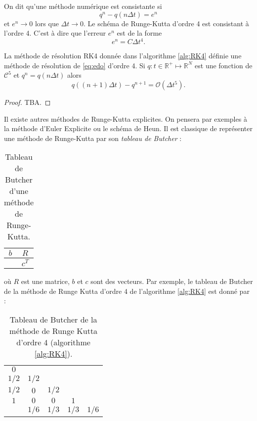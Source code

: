 On dit qu'une méthode numérique est consistante si
\begin{equation}
q^n - q(n \Delta t) = e^n
\end{equation}
et $e^n \rightarrow 0$ lors que $\Delta t \rightarrow 0$. Le schéma de Runge-Kutta d'ordre 4 est consistant à l'ordre 4. C'est à dire que l'erreur $e^n$ est de la forme
\begin{equation}
e^n = C \Delta t^4.
\end{equation}

\begin{theoreme}
La méthode de résolution RK4 donnée dans l'algorithme \ref{alg:RK4} définie une méthode de résolution de \ref{eq:edo} d'ordre 4. Si $q : t \in \mathbb{R}^+ \mapsto \mathbb{R}^N$ est une fonction de $\mathcal{C}^5$ et $q^n = q(n \Delta t)$ alors
\begin{equation}
q((n+1) \Delta t) - q^{n+1} = \mathcal{O} \left( \Delta t^5 \right).
\end{equation}
\end{theoreme}

\begin{proof}
TBA.
\end{proof}

Il existe autres méthodes de Runge-Kutta explicites. On pensera par exemples à la méthode d'Euler Explicite ou le schéma de Heun. Il est classique de représenter une méthode de Runge-Kutta par son \textit{tableau de Butcher} :

\begin{table}[htbp]
\begin{center}
\begin{tabular}{c|c}
$b$ & $R$ \\
\hline
    & $c^T$
\end{tabular}
\end{center}
\caption{Tableau de Butcher d'une méthode de Runge-Kutta.}
\label{tab:butcher}
\end{table}

où $R$ est une matrice, $b$ et $c$ sont des vecteurs. Par exemple, le tableau de Butcher de la méthode de Runge Kutta d'ordre 4 de l'algorithme \ref{alg:RK4} est donné par :

\begin{table}[htbp]
\begin{center}
\begin{tabular}{c|cccc}
$0$   &       &      &      &      \\
$1/2$ & $1/2$ &      &      &      \\
$1/2$ & $0$   & $1/2$&      &      \\
$1$   & $0$   & $0$  & $1$  &      \\  
\hline
      & $1/6$ & $1/3$& $1/3$& $1/6$\\
\end{tabular}
\end{center}
\caption{Tableau de Butcher de la méthode de Runge Kutta d'ordre 4 (algorithme \ref{alg:RK4}).}
\end{table}


